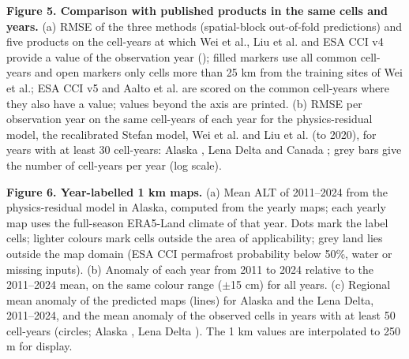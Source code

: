 \textbf{Figure 5. Comparison with published products in the same cells and years.} (a) RMSE of the three methods (spatial-block out-of-fold predictions) and five products on the cell-years at which Wei et al., Liu et al. and ESA CCI v4 provide a value of the observation year (\nyrscc); filled markers use all common cell-years and open markers only cells more than 25 km from the training sites of Wei et al.; ESA CCI v5 and Aalto et al. are scored on the common cell-years where they also have a value; values beyond the axis are printed. (b) RMSE per observation year on the same cell-years of each year for the physics-residual model, the recalibrated Stefan model, Wei et al. and Liu et al. (to 2020), for years with at least 30 cell-years: Alaska \nyrsywAk, Lena Delta \nyrsywLe{} and Canada \nyrsywCa; grey bars give the number of cell-years per year (log scale).

\textbf{Figure 6. Year-labelled 1 km maps.} (a) Mean ALT of 2011--2024 from the physics-residual model in Alaska, computed from the yearly maps; each yearly map uses the full-season ERA5-Land climate of that year. Dots mark the label cells; lighter colours mark cells outside the area of applicability; grey land lies outside the map domain (ESA CCI permafrost probability below 50\%, water or missing inputs). (b) Anomaly of each year from 2011 to 2024 relative to the 2011--2024 mean, on the same colour range ($\pm$15 cm) for all years. (c) Regional mean anomaly of the predicted maps (lines) for Alaska and the Lena Delta, 2011--2024, and the mean anomaly of the observed cells in years with at least 50 cell-years (circles; Alaska \nanobsyrsAk, Lena Delta \nanobsyrsLe). The 1 km values are interpolated to 250 m for display.
